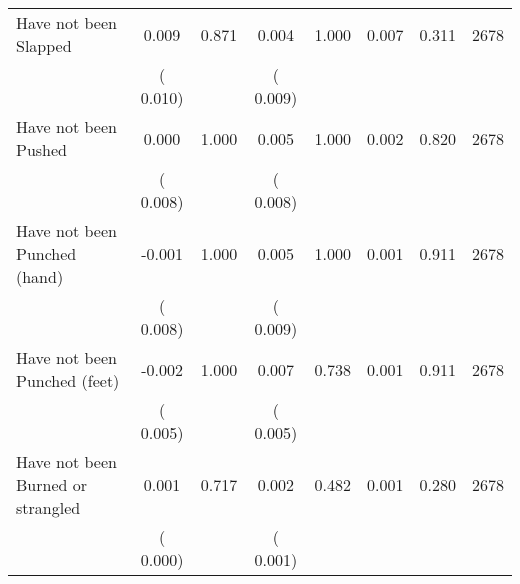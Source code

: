 \begin{tabular}{l*{7}{c}}
 Have not been Slapped       &              0.009       &        0.871  &              0.004       &        1.000  &              0.007       &              0.311 &  2678 \\ 
                       &       (       0.010)             &                               &       (       0.009)                     &                               &                                               &                                &                      \\ 

 Have not been Pushed       &              0.000       &        1.000  &              0.005       &        1.000  &              0.002       &              0.820 &  2678 \\ 
                       &       (       0.008)             &                               &       (       0.008)                     &                               &                                               &                                &                      \\ 

 Have not been Punched (hand)       &             -0.001       &        1.000  &              0.005       &        1.000  &              0.001       &              0.911 &  2678 \\ 
                       &       (       0.008)             &                               &       (       0.009)                     &                               &                                               &                                &                      \\ 

 Have not been Punched (feet)       &             -0.002       &        1.000  &              0.007       &        0.738  &              0.001       &              0.911 &  2678 \\ 
                       &       (       0.005)             &                               &       (       0.005)                     &                               &                                               &                                &                      \\ 

 Have not been Burned or strangled       &              0.001       &        0.717  &              0.002       &        0.482  &              0.001       &              0.280 &  2678 \\ 
                       &       (       0.000)             &                               &       (       0.001)                     &                               &                                               &                                &                      \\ 


\end{tabular}
